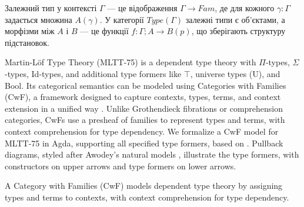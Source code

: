 \documentclass{article}
\begin{document}
\begin{definition}
Залежний тип у контексті $\Gamma$ --- це відображення $\Gamma \rightarrow Fam$, де для кожного $\gamma:\Gamma$ задається множина $A(\gamma)$. У категорії $Type(\Gamma)$ залежні типи є об’єктами, а морфізми між $A$ і $B$ --- це функції $f: \Gamma;A \rightarrow B(p)$, що зберігають структуру підстановок.
\end{definition}

Martin-Löf Type Theory (MLTT-75) is a dependent type theory with $\Pi$-types, $\Sigma$-types, Id-types, and additional type formers like $\top$, universe types (U), and Bool. Its categorical semantics can be modeled using Categories with Families (CwF), a framework designed to capture contexts, types, terms, and context extension in a unified way \cite{awodey2019, ncatlab}. Unlike Grothendieck fibrations or comprehension categories, CwFs use a presheaf of families to represent types and terms, with context comprehension for type dependency. We formalize a CwF model for MLTT-75 in Agda, supporting all specified type formers, based on \cite{awodey2019}. Pullback diagrams, styled after Awodey’s natural models \cite{awodey}, illustrate the type formers, with constructors on upper arrows and type formers on lower arrows.

A Category with Families (CwF) models dependent type theory by assigning types and terms to contexts, with context comprehension for type dependency.
\end{document}
